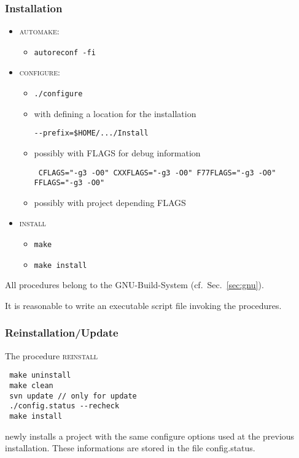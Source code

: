 \subsubsection{Installation}
\begin{itemize}
	\item \textsc{automake}:
	\begin{itemize}
		\item[] \begin{verbatim}autoreconf -fi\end{verbatim}
	\end{itemize}
	\item \textsc{configure}: 
	\begin{itemize}
		\item[] \begin{verbatim}./configure \end{verbatim}
        \item[] with defining a location for the installation 
                \begin{verbatim}--prefix=$HOME/.../Install\end{verbatim}
        \item[] possibly with FLAGS for debug information
		        \begin{verbatim} CFLAGS="-g3 -O0" CXXFLAGS="-g3 -O0" F77FLAGS="-g3 -O0" FFLAGS="-g3 -O0" \end{verbatim}
		\item[] possibly with project depending FLAGS
	\end{itemize}
	\item \textsc{install}
	\begin{itemize}	
		\item \begin{verbatim}make\end{verbatim}
		\item \begin{verbatim}make install\end{verbatim}
	\end{itemize}
\end{itemize}
All procedures belong to the GNU-Build-System (cf.~Sec.~\ref{sec:gnu}).\par
It is reasonable to write an executable script file invoking the procedures.

\subsubsection{Reinstallation/Update}
The procedure \textsc{reinstall}
\begin{verbatim}
 make uninstall 
 make clean
 svn update // only for update
 ./config.status --recheck
 make install
\end{verbatim}
newly installs a project with the same configure options used at the previous installation. These informations are stored in the file config.status.\par 


